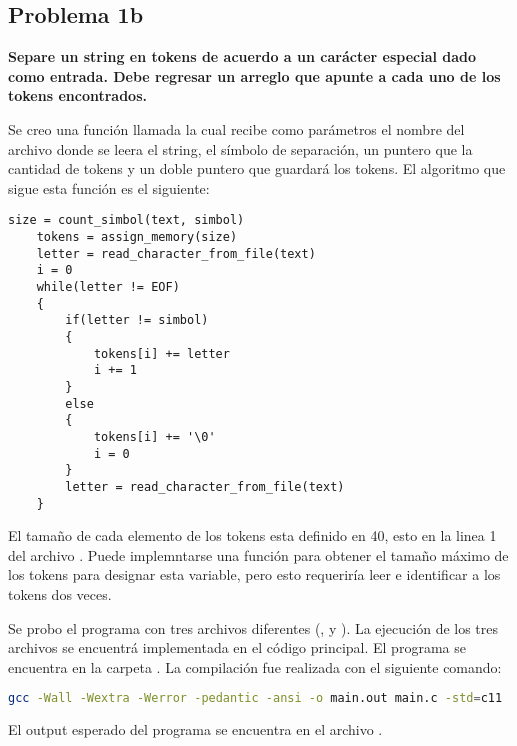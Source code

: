 \subsection*{Problema 1b}

\textbf{Separe un string en tokens de acuerdo a un carácter especial dado como entrada. Debe regresar un arreglo que apunte a cada uno de los tokens encontrados.}

Se creo una función llamada  la cual recibe como parámetros el nombre del archivo donde se leera el string, el símbolo de separación, un puntero que la cantidad de tokens y un doble puntero que guardará los tokens. El algoritmo que sigue esta función es el siguiente:

\begin{lstlisting}[style=CStyle]
    size = count_simbol(text, simbol)
    tokens = assign_memory(size)
    letter = read_character_from_file(text)
    i = 0
    while(letter != EOF)
    {
        if(letter != simbol)
        {
            tokens[i] += letter
            i += 1
        }
        else
        {
            tokens[i] += '\0'
            i = 0
        }
        letter = read_character_from_file(text)
    }
\end{lstlisting}

El tamaño de cada elemento de los tokens esta definido en 40, esto en la linea 1 del archivo . Puede implemntarse una función para obtener el tamaño máximo de los tokens para designar esta variable, pero esto requeriría leer e identificar a los tokens dos veces.

Se probo el programa con tres archivos diferentes (,  y ). La ejecución de los tres archivos se encuentrá implementada en el código principal. El programa se encuentra en la carpeta . La compilación fue realizada con el siguiente comando:

\begin{lstlisting}[language=bash]
    gcc -Wall -Wextra -Werror -pedantic -ansi -o main.out main.c -std=c11
\end{lstlisting}

El output esperado del programa se encuentra en el archivo .
